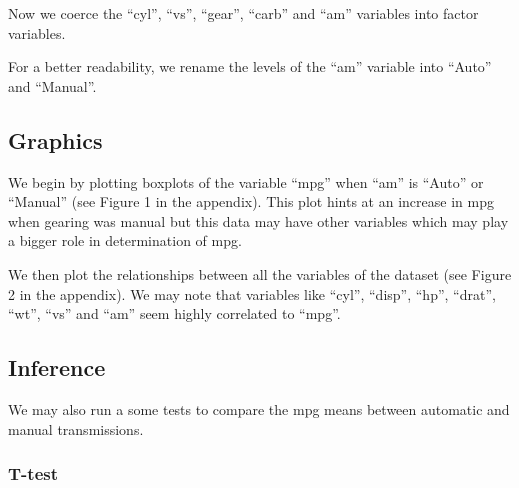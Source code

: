 \documentclass[a3paper]{article}
\newenvironment{Shaded}{\begin{snugshade}}{\end{snugshade}}
\newcommand{\KeywordTok}[1]{\textcolor[rgb]{0.13,0.29,0.53}{\textbf{{#1}}}}
\newcommand{\StringTok}[1]{\textcolor[rgb]{0.31,0.60,0.02}{{#1}}}
\newcommand{\NormalTok}[1]{{#1}}
\begin{document}
Now we coerce the ``cyl'', ``vs'', ``gear'', ``carb'' and ``am''
variables into factor variables.

\begin{Shaded}
\end{Shaded}

For a better readability, we rename the levels of the ``am'' variable
into ``Auto'' and ``Manual''.

\begin{Shaded}
\end{Shaded}

\subsection{Graphics}\label{graphics}

We begin by plotting boxplots of the variable ``mpg'' when ``am'' is
``Auto'' or ``Manual'' (see Figure 1 in the appendix). This plot hints
at an increase in mpg when gearing was manual but this data may have
other variables which may play a bigger role in determination of mpg.

We then plot the relationships between all the variables of the dataset
(see Figure 2 in the appendix). We may note that variables like ``cyl'',
``disp'', ``hp'', ``drat'', ``wt'', ``vs'' and ``am'' seem highly
correlated to ``mpg''.

\subsection{Inference}\label{inference}

We may also run a some tests to compare the mpg means between automatic
and manual transmissions.

\subsubsection{T-test}\label{t-test}
\end{document}
